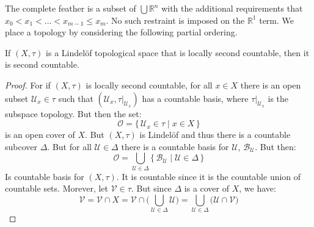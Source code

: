 \documentclass[oneside]{book}                                                  %
\begin{document}
            The complete feather is a subset of $\bigcup\mathbb{R}^{n}$ with the
            additional requirements that $x_{0}<x_{1}<\dots<x_{m-1}\leq{x}_{m}$.
            No such restraint is imposed on the $\mathbb{R}^{1}$ term. We place
            a topology by considering the following partial ordering.
            \begin{theorem}
                If $(X,\tau)$ is a Lindel\"{o}f topological space that is
                locally second countable, then it is second countable.
            \end{theorem}
            \begin{proof}
                For if $(X,\tau)$ is locally second countable, for all $x\in{X}$
                there is an open subset $\mathcal{U}_{x}\in\tau$ such that
                $(\mathcal{U}_{x},\tau|_{\mathcal{U}_{x}})$ has a countable
                basis, where $\tau|_{\mathcal{U}_{x}}$ is the subspace topology.
                But then the set:
                \begin{equation}
                    \mathcal{O}=
                    \{\,\mathcal{U}_{x}\in\tau\;|\;x\in{X}\,\}
                \end{equation}
                is an open cover of $X$. But $(X,\tau)$ is Lindel\"{o}f and thus
                there is a countable subcover $\Delta$. But for all
                $\mathcal{U}\in\Delta$ there is a countable basis for
                $\mathcal{U}$, $\mathscr{B}_{\mathcal{U}}$. But then:
                \begin{equation}
                    \mathscr{O}=
                    \bigcup_{\mathcal{U}\in\Delta}
                        \{\,\mathscr{B}_{\mathcal{U}}\;|\;
                            \mathcal{U}\in\Delta\,\}
                \end{equation}
                Is countable basis for $(X,\tau)$. It is countable since it is
                the countable union of countable sets. Morever, let
                $\mathcal{V}\in\tau$. But since $\Delta$ is a cover of $X$, we
                have:
                \begin{equation}
                    \mathcal{V}
                    =\mathcal{V}\cap{X}
                    =\mathcal{V}\cap\Big(
                        \bigcup_{\mathcal{U}\in\Delta}\mathcal{U}
                    \Big)
                    =\bigcup_{\mathcal{U}\in\Delta}\big(
                        \mathcal{U}\cap\mathcal{V}
                    \big)
                \end{equation}

\end{proof}
\end{document}

